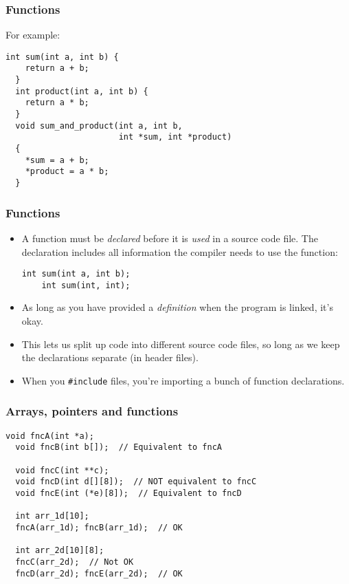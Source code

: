 \begin{frame}[fragile]
  \frametitle{Functions}
  For example:
\begin{lstlisting}[style=c]
  int sum(int a, int b) {
    return a + b;
  }
  int product(int a, int b) {
    return a * b;
  }
  void sum_and_product(int a, int b,
                       int *sum, int *product)
  {
    *sum = a + b;
    *product = a * b;
  }
\end{lstlisting}
\end{frame}

\begin{frame}[fragile]
  \frametitle{Functions}
  \begin{itemize}
  \item A function must be \emph{declared} before it is \emph{used} in a source
    code file. The declaration includes all information the compiler needs to
    use the function:
\begin{lstlisting}[style=c]
    int sum(int a, int b);
    int sum(int, int);
\end{lstlisting}
  \item As long as you have provided a \emph{definition} when the program is
    linked, it's okay.
  \item This lets us split up code into different source code files, so long as
    we keep the declarations separate (in header files).
  \item When you \texttt{\#include} files, you're importing a bunch of function
    declarations.
  \end{itemize}
\end{frame}

\begin{frame}[fragile]
  \frametitle{Arrays, pointers and functions}
\begin{lstlisting}[style=c]
  void fncA(int *a);
  void fncB(int b[]);  // Equivalent to fncA

  void fncC(int **c);
  void fncD(int d[][8]);  // NOT equivalent to fncC
  void fncE(int (*e)[8]);  // Equivalent to fncD

  int arr_1d[10];
  fncA(arr_1d); fncB(arr_1d);  // OK

  int arr_2d[10][8];
  fncC(arr_2d);  // Not OK
  fncD(arr_2d); fncE(arr_2d);  // OK
\end{lstlisting}
\end{frame}

